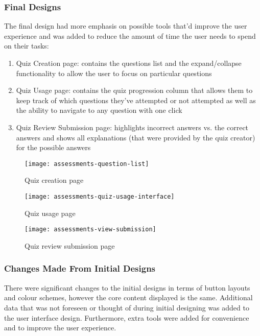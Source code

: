 \subsubsection{Final Designs}
The final design had more emphasis on possible tools that'd improve the user experience and was added to reduce the amount of time the user needs to spend on their tasks: 

\begin{enumerate}
	\item Quiz Creation page: contains the questions list and the expand/collapse functionality to allow the user to focus on particular questions
	\item Quiz Usage page: contains the quiz progression column that allows them to keep track of which questions they've attempted or not attempted as well as the ability to navigate to any question with one click
	\item Quiz Review Submission page: highlights incorrect answers vs. the correct answers and shows all explanations (that were provided by the quiz creator) for the possible answers
\end{enumerate}

\begin{figure}[!hbpt]
	\centering
	\texttt{[image: assessments-question-list]}
	\caption{Quiz creation page}
\end{figure}

\begin{figure}[!hbpt]
	\centering
	\texttt{[image: assessments-quiz-usage-interface]}
	\caption{Quiz usage page}
\end{figure}

\begin{figure}[!hbpt]
	\centering
	\texttt{[image: assessments-view-submission]}
	\caption{Quiz review submission page}
\end{figure}


\subsubsection{Changes Made From Initial Designs}
There were significant changes to the initial designs in terms of button layouts and colour schemes, however the core content displayed is the same. Additional data that was not foreseen or thought of during initial designing was added to the user interface design. Furthermore, extra tools were added for convenience and to improve the user experience. 

